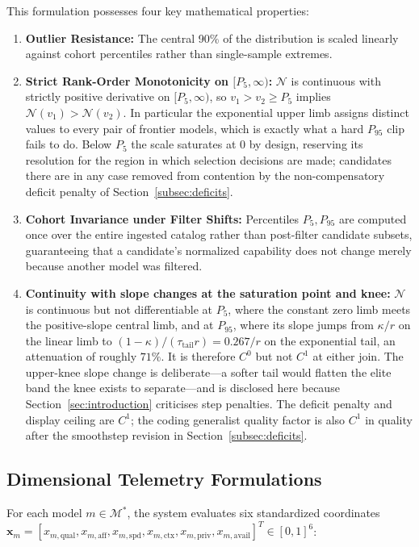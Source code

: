 \documentclass[pdflatex,sn-mathphys-num]{sn-jnl}
\theoremstyle{thmstyleone}
\theoremstyle{thmstylethree}
\begin{document}
This formulation possesses four key mathematical properties:
\begin{enumerate}
  \item \textbf{Outlier Resistance:} The central 90\% of the distribution is scaled linearly against cohort percentiles rather than single-sample extremes.
  \item \textbf{Strict Rank-Order Monotonicity on $[P_5, \infty)$:} $\mathcal{N}$ is continuous with strictly positive derivative on $[P_5, \infty)$, so $v_1 > v_2 \ge P_5$ implies $\mathcal{N}(v_1) > \mathcal{N}(v_2)$. In particular the exponential upper limb assigns distinct values to every pair of frontier models, which is exactly what a hard $P_{95}$ clip fails to do. Below $P_5$ the scale saturates at $0$ by design, reserving its resolution for the region in which selection decisions are made; candidates there are in any case removed from contention by the non-compensatory deficit penalty of Section~\ref{subsec:deficits}.
  \item \textbf{Cohort Invariance under Filter Shifts:} Percentiles $P_5, P_{95}$ are computed once over the entire ingested catalog rather than post-filter candidate subsets, guaranteeing that a candidate's normalized capability does not change merely because another model was filtered.
  \item \textbf{Continuity with slope changes at the saturation point and knee:} $\mathcal{N}$ is continuous but not differentiable at $P_5$, where the constant zero limb meets the positive-slope central limb, and at $P_{95}$, where its slope jumps from $\kappa / r$ on the linear limb to $(1 - \kappa)/(\tau_{\mathrm{tail}} r) = 0.267 / r$ on the exponential tail, an attenuation of roughly $71\%$. It is therefore $C^0$ but not $C^1$ at either join. The upper-knee slope change is deliberate---a softer tail would flatten the elite band the knee exists to separate---and is disclosed here because Section~\ref{sec:introduction} criticises step penalties. The deficit penalty and display ceiling are $C^1$; the coding generalist quality factor is also $C^1$ in quality after the smoothstep revision in Section~\ref{subsec:deficits}.
\end{enumerate}

\subsection{Dimensional Telemetry Formulations}\label{subsec:dimensions}

For each model $m \in \mathcal{M}^*$, the system evaluates six standardized coordinates $\mathbf{x}_m = [x_{m, \text{qual}}, x_{m, \text{aff}}, x_{m, \text{spd}}, x_{m, \text{ctx}}, x_{m, \text{priv}}, x_{m, \text{avail}}]^T \in [0, 1]^6$:
\end{document}
